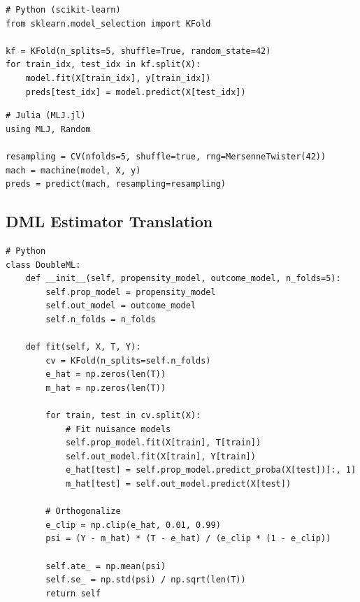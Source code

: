 \begin{verbatim}
# Python (scikit-learn)
from sklearn.model_selection import KFold

kf = KFold(n_splits=5, shuffle=True, random_state=42)
for train_idx, test_idx in kf.split(X):
    model.fit(X[train_idx], y[train_idx])
    preds[test_idx] = model.predict(X[test_idx])
\end{verbatim}

\begin{verbatim}
# Julia (MLJ.jl)
using MLJ, Random

resampling = CV(nfolds=5, shuffle=true, rng=MersenneTwister(42))
mach = machine(model, X, y)
preds = predict(mach, resampling=resampling)
\end{verbatim}

\subsection{DML Estimator Translation}

\begin{verbatim}
# Python
class DoubleML:
    def __init__(self, propensity_model, outcome_model, n_folds=5):
        self.prop_model = propensity_model
        self.out_model = outcome_model
        self.n_folds = n_folds

    def fit(self, X, T, Y):
        cv = KFold(n_splits=self.n_folds)
        e_hat = np.zeros(len(T))
        m_hat = np.zeros(len(T))

        for train, test in cv.split(X):
            # Fit nuisance models
            self.prop_model.fit(X[train], T[train])
            self.out_model.fit(X[train], Y[train])
            e_hat[test] = self.prop_model.predict_proba(X[test])[:, 1]
            m_hat[test] = self.out_model.predict(X[test])

        # Orthogonalize
        e_clip = np.clip(e_hat, 0.01, 0.99)
        psi = (Y - m_hat) * (T - e_hat) / (e_clip * (1 - e_clip))

        self.ate_ = np.mean(psi)
        self.se_ = np.std(psi) / np.sqrt(len(T))
        return self
\end{verbatim}

